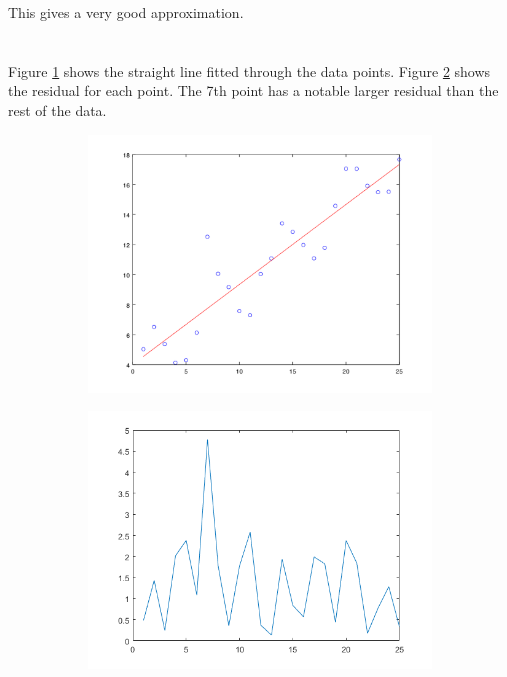 \documentclass[12pt]{article}
\begin{document}
This gives a very good approximation.


\section{}

\subsection{} %

Figure \ref{fig_3a_plot} shows the straight line fitted through the data points. Figure \ref{fig_3a_r} shows the residual for each point. The 7th point has a notable larger residual than the rest of the data.

\begin{figure}[t!]
    \begin{subfigure}[t]{0.5\textwidth}
        \centering
        \includegraphics[width=\linewidth]{plot_3a}
        \caption{}
        \label{fig_3a_plot}
    \end{subfigure}
    \begin{subfigure}[t]{0.5\textwidth}
        \centering
        \includegraphics[width=\linewidth]{plot_3a_r}
        \caption{}
        \label{fig_3a_r}
    \end{subfigure}
    \caption{}
    \label{fig_3a}
\end{figure}
\end{document}
